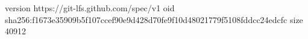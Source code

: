 version https://git-lfs.github.com/spec/v1
oid sha256:f1673e35909b5f107ccef90e9d428d70fe9f10d48021779f5108fddcc24edcfc
size 40912
